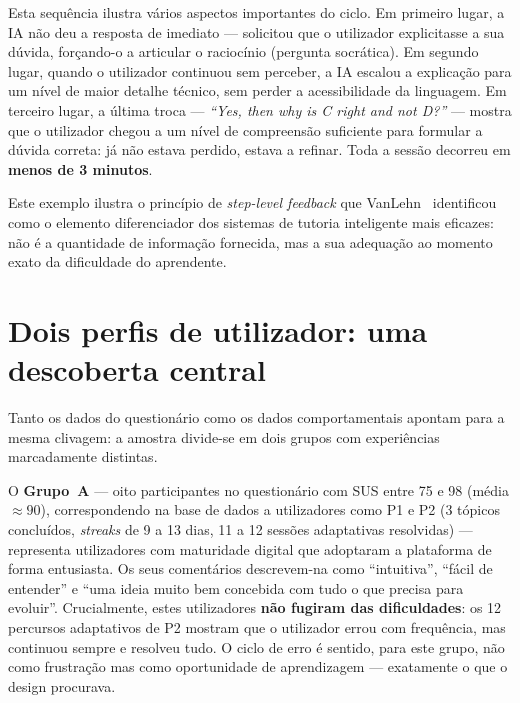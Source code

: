 \medskip
Esta sequência ilustra vários aspectos importantes do ciclo. Em primeiro lugar, a IA não deu a resposta de imediato --- solicitou que o utilizador explicitasse a sua dúvida, forçando-o a articular o raciocínio (pergunta socrática). Em segundo lugar, quando o utilizador continuou sem perceber, a IA escalou a explicação para um nível de maior detalhe técnico, sem perder a acessibilidade da linguagem. Em terceiro lugar, a última troca --- \emph{``Yes, then why is C right and not D?''} --- mostra que o utilizador chegou a um nível de compreensão suficiente para formular a dúvida correta: já não estava perdido, estava a refinar. Toda a sessão decorreu em \textbf{menos de 3 minutos}.

Este exemplo ilustra o princípio de \emph{step-level feedback} que VanLehn~\cite{vanlehn2011relative} identificou como o elemento diferenciador dos sistemas de tutoria inteligente mais eficazes: não é a quantidade de informação fornecida, mas a sua adequação ao momento exato da dificuldade do aprendente.

\section{Dois perfis de utilizador: uma descoberta central}
\label{sec:dois-grupos}

Tanto os dados do questionário como os dados comportamentais apontam para a mesma clivagem: a amostra divide-se em dois grupos com experiências marcadamente distintas.

O \textbf{Grupo~A} --- oito participantes no questionário com SUS entre 75 e 98 (média $\approx 90$), correspondendo na base de dados a utilizadores como P1 e P2 (3 tópicos concluídos, \emph{streaks} de 9 a 13 dias, 11 a 12 sessões adaptativas resolvidas) --- representa utilizadores com maturidade digital que adoptaram a plataforma de forma entusiasta. Os seus comentários descrevem-na como ``intuitiva'', ``fácil de entender'' e ``uma ideia muito bem concebida com tudo o que precisa para evoluir''. Crucialmente, estes utilizadores \textbf{não fugiram das dificuldades}: os 12 percursos adaptativos de P2 mostram que o utilizador errou com frequência, mas continuou sempre e resolveu tudo. O ciclo de erro é sentido, para este grupo, não como frustração mas como oportunidade de aprendizagem --- exatamente o que o design procurava.


